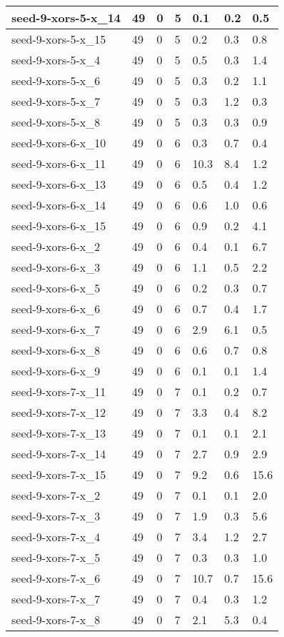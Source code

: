 \begin{scriptsize}
\begin{longtable}{|p{5cm}|l|l|l|l|l|l|}
seed-9-xors-5-x\_14&49&0&5&0.1&0.2&0.5 \\ \hline 
seed-9-xors-5-x\_15&49&0&5&0.2&0.3&0.8 \\ \hline 
seed-9-xors-5-x\_4&49&0&5&0.5&0.3&1.4 \\ \hline 
seed-9-xors-5-x\_6&49&0&5&0.3&0.2&1.1 \\ \hline 
seed-9-xors-5-x\_7&49&0&5&0.3&1.2&0.3 \\ \hline 
seed-9-xors-5-x\_8&49&0&5&0.3&0.3&0.9 \\ \hline 
seed-9-xors-6-x\_10&49&0&6&0.3&0.7&0.4 \\ \hline 
seed-9-xors-6-x\_11&49&0&6&10.3&8.4&1.2 \\ \hline 
seed-9-xors-6-x\_13&49&0&6&0.5&0.4&1.2 \\ \hline 
seed-9-xors-6-x\_14&49&0&6&0.6&1.0&0.6 \\ \hline 
seed-9-xors-6-x\_15&49&0&6&0.9&0.2&4.1 \\ \hline 
seed-9-xors-6-x\_2&49&0&6&0.4&0.1&6.7 \\ \hline 
seed-9-xors-6-x\_3&49&0&6&1.1&0.5&2.2 \\ \hline 
seed-9-xors-6-x\_5&49&0&6&0.2&0.3&0.7 \\ \hline 
seed-9-xors-6-x\_6&49&0&6&0.7&0.4&1.7 \\ \hline 
seed-9-xors-6-x\_7&49&0&6&2.9&6.1&0.5 \\ \hline 
seed-9-xors-6-x\_8&49&0&6&0.6&0.7&0.8 \\ \hline 
seed-9-xors-6-x\_9&49&0&6&0.1&0.1&1.4 \\ \hline 
seed-9-xors-7-x\_11&49&0&7&0.1&0.2&0.7 \\ \hline 
seed-9-xors-7-x\_12&49&0&7&3.3&0.4&8.2 \\ \hline 
seed-9-xors-7-x\_13&49&0&7&0.1&0.1&2.1 \\ \hline 
seed-9-xors-7-x\_14&49&0&7&2.7&0.9&2.9 \\ \hline 
seed-9-xors-7-x\_15&49&0&7&9.2&0.6&15.6 \\ \hline 
seed-9-xors-7-x\_2&49&0&7&0.1&0.1&2.0 \\ \hline 
seed-9-xors-7-x\_3&49&0&7&1.9&0.3&5.6 \\ \hline 
seed-9-xors-7-x\_4&49&0&7&3.4&1.2&2.7 \\ \hline 
seed-9-xors-7-x\_5&49&0&7&0.3&0.3&1.0 \\ \hline 
seed-9-xors-7-x\_6&49&0&7&10.7&0.7&15.6 \\ \hline 
seed-9-xors-7-x\_7&49&0&7&0.4&0.3&1.2 \\ \hline 
seed-9-xors-7-x\_8&49&0&7&2.1&5.3&0.4 \\ \hline 

\end{longtable}
\end{scriptsize}
